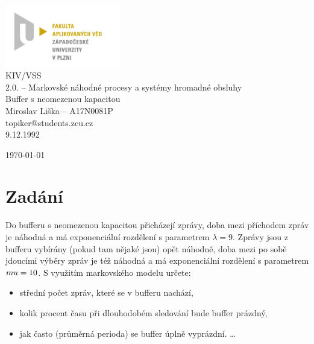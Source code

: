 \documentclass{article}
\begin{document}


\begin{titlepage}	
	\begin{center}
		\includegraphics[width=5cm]{logo.jpg}\\[3.5cm]
		{\Huge KIV/VSS}\\[0.5cm]
		{\Large 2.0. – Markovské náhodné procesy a systémy hromadné obsluhy}\\[0.5cm]
		{\large  Buffer s neomezenou kapacitou}\\[4.5cm]
		{\large  Miroslav Liška – A17N0081P}\\[0.5cm]
		{\large  topiker@students.zcu.cz}\\[0.5cm]
		{\large   9.12.1992}\\[0.5cm]
		\vfill

		{\large \today}

	\end{center}
\end{titlepage}



\section{Zadání} %
\setcounter{page}{1}
Do bufferu s neomezenou kapacitou přicházejí zprávy, doba mezi příchodem zpráv je náhodná a má exponenciální rozdělení s parametrem \( \lambda = 9 \).
Zprávy jsou z bufferu vybírány (pokud tam nějaké jsou) opět náhodně, doba mezi po sobě jdoucími výběry zpráv je též náhodná a má exponenciální rozdělení s parametrem \( \\mu = 10 \).
S využitím markovského modelu určete:
\begin{itemize}  
\item střední počet zpráv, které se v bufferu nachází,
\item kolik procent času při dlouhodobém sledování bude buffer prázdný,
\item jak často (průměrná perioda) se buffer úplně vyprázdní. \ldots 
\end{itemize}
\end{document}
